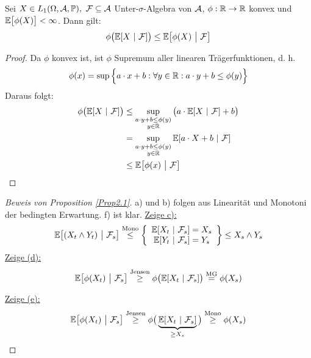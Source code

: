 \begin{lemma}\label{lemma2.2BedingteJensenscheUngleichung}\enter
Sei $X\in L_1(\Omega,\mathcal{A},\mathbb{P}),~\mathcal{F}\subseteq\mathcal{A}$ Unter-$\sigma$-Algebra von $\mathcal{A}$, $\phi:\mathbb{R}\to\mathbb{R}$ konvex und\\ $\mathbb{E}\big[\phi(X)\big]<\infty$. Dann gilt:
\begin{align*}
\phi\big(\mathbb{E}[X~|~\mathcal{F}]\big)\leq\mathbb{E}\big[\phi(X)~\big|~\mathcal{F}\big]
\end{align*}
\end{lemma}
\begin{proof}
Da $\phi$ konvex ist, ist $\phi$ Supremum aller linearen Trägerfunktionen, d. h.
\begin{align*}
\phi(x)=\sup\Big\lbrace a\cdot x+b:\forall y\in \mathbb{R}: a\cdot y+b\leq\phi(y)\Big\rbrace
\end{align*}
Daraus folgt:
\begin{align*}
\phi\big(\mathbb{E}[X~|~\mathcal{F}]\big)
&\leq\sup\limits_{\begin{subarray}{c}a\cdot y+b\leq\phi(y)\\y\in\mathbb{R}\end{subarray}}\big(a\cdot\mathbb{E}[X~|~\mathcal{F}]+b\big) \\
&=\sup\limits_{\begin{subarray}{c}a\cdot y+b\leq\phi(y)\\y\in\mathbb{R}\end{subarray}}
\mathbb{E}[a\cdot X+b~|~\mathcal{F}] \\
&\leq \mathbb{E}\big[\phi(x)~\big|~\mathcal{F}\big]
\end{align*}
\end{proof}

\begin{proof}[Beweis von Proposition \ref{Prop2.1}]
a) und b) folgen aus Linearität und Monotoni der bedingten Erwartung. f) ist klar.\nl
\underline{Zeige c):}
\begin{align*}
\mathbb{E}\big[(X_t\wedge Y_t)~\big|~\mathcal{F}_s\big]
\stackrel{\text{Mono}}{\leq}
\left\lbrace\begin{array}{c}
\mathbb{E}[X_t~|~\mathcal{F}_s]=X_s\\
\mathbb{E}[Y_t~|~\mathcal{F}_s]=Y_s\\
\end{array}\right\rbrace
\leq X_s\wedge Y_s
\end{align*}
\underline{Zeige (d):}
\begin{align*}
\mathbb{E}\big[\phi(X_t)~\big|~\mathcal{F}_s\big]
\stackrel{\text{Jensen}}{\geq}
\phi\big(\mathbb{E}[X_t~|~\mathcal{F}_s]\big)
\stackrel{\text{MG}}{=}
\phi(X_s)
\end{align*}

\underline{Zeige (e):}
\begin{align*}
\mathbb{E}\big[\phi(X_t)~\big|~\mathcal{F}_s\big]
\stackrel{\text{Jensen}}{\geq}
\phi\big(\underbrace{\mathbb{E}[X_t~|~\mathcal{F}_s]}_{\geq X_s}\big)
\stackrel{\text{Mono}}{\geq}
\phi(X_s)
\end{align*}
\end{proof}

